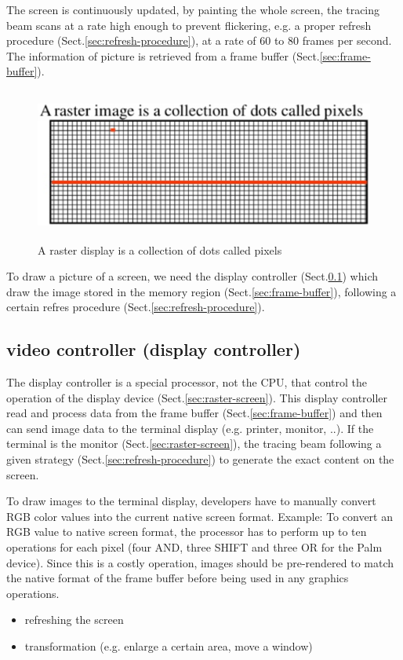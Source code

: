 The screen is continuously updated, by painting the whole screen, the tracing
beam scans at a rate high enough to prevent flickering, e.g. a proper refresh
procedure (Sect.\ref{sec:refresh-procedure}), at a rate of 60 to 80 frames per
second. The information of picture is retrieved from a frame buffer
(Sect.\ref{sec:frame-buffer}).

\begin{figure}[hbt]
  \centerline{\includegraphics[height=5cm,
    angle=0]{./images/raster-display.eps}}
\caption{A raster display is a collection of dots called pixels}
\label{fig:raster-display}
\end{figure}

To draw a picture of a screen, we need the display controller
(Sect.\ref{sec:display-controller}) which draw the image stored in the memory
region (Sect.\ref{sec:frame-buffer}), following a certain refres procedure
(Sect.\ref{sec:refresh-procedure}).
  
\subsection{video controller (display controller)}
\label{sec:display-controller}

The display controller is a special processor, not the CPU, that control the
operation of the display device (Sect.\ref{sec:raster-screen}). 
This display controller read and process data from the frame buffer
(Sect.\ref{sec:frame-buffer}) and then can send image data to the terminal
display (e.g. printer, monitor, ..). If the terminal is the monitor
(Sect.\ref{sec:raster-screen}), the tracing beam following a given
strategy (Sect.\ref{sec:refresh-procedure}) to generate the exact content on
the screen.


To draw images to the terminal display, developers have to manually  convert RGB
color  values  into  the  current native screen format. Example: To  convert  an
RGB  value  to native  screen  format,  the  processor has  to  perform  up  to
ten operations  for  each  pixel  (four  AND,  three SHIFT  and  three  OR for
the  Palm  device). Since  this  is  a  costly  operation,  images  should  be
pre-rendered  to match  the  native  format  of  the  frame buffer   before  
being   used   in any   graphics   operations.
\begin{itemize}
  \item refreshing the screen
  
  \item transformation (e.g. enlarge a certain area, move a window)
  
\end{itemize}

